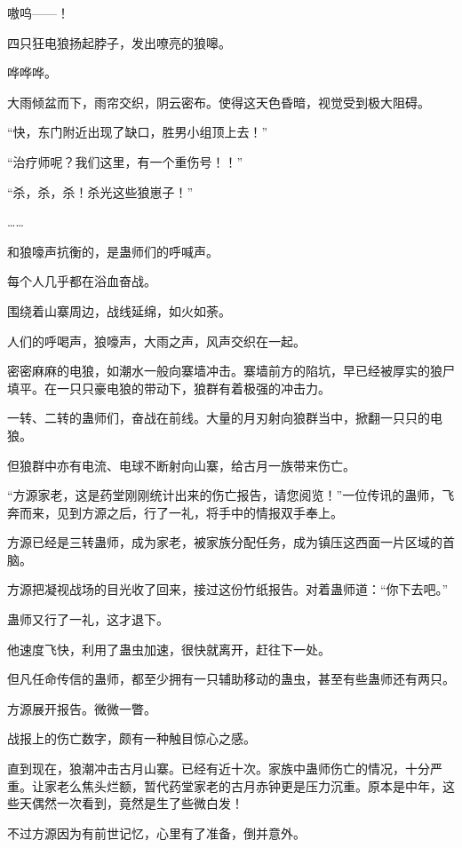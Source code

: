 
\begin{this_body}

嗷呜——！

四只狂电狼扬起脖子，发出嘹亮的狼嗥。

哗哗哗。

大雨倾盆而下，雨帘交织，阴云密布。使得这天色昏暗，视觉受到极大阻碍。

“快，东门附近出现了缺口，胜男小组顶上去！”

“治疗师呢？我们这里，有一个重伤号！！”

“杀，杀，杀！杀光这些狼崽子！”

……

和狼嚎声抗衡的，是蛊师们的呼喊声。

每个人几乎都在浴血奋战。

围绕着山寨周边，战线延绵，如火如荼。

人们的呼喝声，狼嚎声，大雨之声，风声交织在一起。

密密麻麻的电狼，如潮水一般向寨墙冲击。寨墙前方的陷坑，早已经被厚实的狼尸填平。在一只只豪电狼的带动下，狼群有着极强的冲击力。

一转、二转的蛊师们，奋战在前线。大量的月刃射向狼群当中，掀翻一只只的电狼。

但狼群中亦有电流、电球不断射向山寨，给古月一族带来伤亡。

“方源家老，这是药堂刚刚统计出来的伤亡报告，请您阅览！”一位传讯的蛊师，飞奔而来，见到方源之后，行了一礼，将手中的情报双手奉上。

方源已经是三转蛊师，成为家老，被家族分配任务，成为镇压这西面一片区域的首脑。

方源把凝视战场的目光收了回来，接过这份竹纸报告。对着蛊师道：“你下去吧。”

蛊师又行了一礼，这才退下。

他速度飞快，利用了蛊虫加速，很快就离开，赶往下一处。

但凡任命传信的蛊师，都至少拥有一只辅助移动的蛊虫，甚至有些蛊师还有两只。

方源展开报告。微微一瞥。

战报上的伤亡数字，颇有一种触目惊心之感。

直到现在，狼潮冲击古月山寨。已经有近十次。家族中蛊师伤亡的情况，十分严重。让家老么焦头烂额，暂代药堂家老的古月赤钟更是压力沉重。原本是中年，这些天偶然一次看到，竟然是生了些微白发！

不过方源因为有前世记忆，心里有了准备，倒并意外。


\end{this_body}

